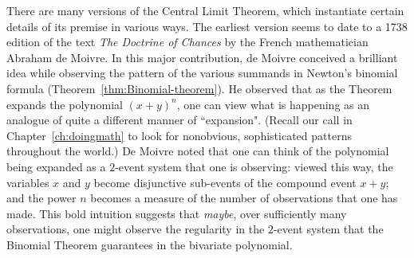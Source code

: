 \bigskip

\noindent {}

\bigskip

There are many versions of the Central Limit Theorem, which instantiate certain details of its premise in various ways.  The earliest version seems to date to a 1738 edition of the text {\it The Doctrine of Chances} by the French mathematician Abraham de Moivre.  In this major contribution, de Moivre conceived a brilliant idea while observing the pattern of the various summands in Newton's binomial formula (Theorem~\ref{thm:Binomial-theorem}).  He observed that as the Theorem expands the polynomial $(x+y)^n$, one can view what is happening as an analogue of quite a different manner of ``expansion".  (Recall our call in Chapter~\ref{ch:doingmath} to look for nonobvious, sophisticated patterns throughout the world.)  De Moivre noted that one can think of the polynomial being expanded as a $2$-event system that one is observing: viewed this way, the variables $x$ and $y$ become disjunctive sub-events of the compound event $x+y$; and the power $n$ becomes a measure of the number of observations that one has made.  This bold intuition suggests that {\em maybe}, over sufficiently many observations, one might observe the regularity in the $2$-event system that the Binomial Theorem guarantees in the bivariate polynomial.

